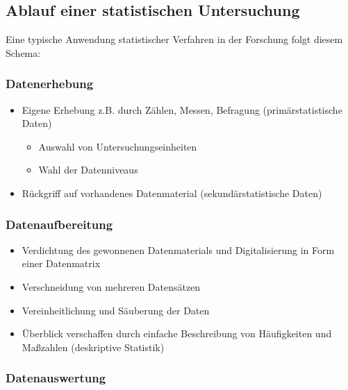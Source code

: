 \documentclass[
  11pt,
  ngerman,
  a4paper,
]{report}
\providecommand{\tightlist}{%
  \setlength{\itemsep}{0pt}\setlength{\parskip}{0pt}}
\begin{document}
\hypertarget{ablauf-einer-statistischen-untersuchung}{%
\subsection{Ablauf einer statistischen Untersuchung}\label{ablauf-einer-statistischen-untersuchung}}

Eine typische Anwendung statistischer Verfahren in der Forschung folgt diesem Schema:

\hypertarget{datenerhebung}{%
\subsubsection{Datenerhebung}\label{datenerhebung}}

\begin{itemize}
\tightlist
\item
  Eigene Erhebung z.B. durch Zählen, Messen, Befragung (primärstatistische Daten)

  \begin{itemize}
  \tightlist
  \item
    Auswahl von Untersuchungseinheiten
  \item
    Wahl der Datenniveaus
  \end{itemize}
\item
  Rückgriff auf vorhandenes Datenmaterial (sekundärstatistische Daten)
\end{itemize}

\hypertarget{datenaufbereitung}{%
\subsubsection{Datenaufbereitung}\label{datenaufbereitung}}

\begin{itemize}
\tightlist
\item
  Verdichtung des gewonnenen Datenmaterials und Digitalisierung in Form einer Datenmatrix
\item
  Verschneidung von mehreren Datensätzen
\item
  Vereinheitlichung und Säuberung der Daten
\item
  Überblick verschaffen durch einfache Beschreibung von Häufigkeiten und Maßzahlen (deskriptive Statistik)
\end{itemize}

\hypertarget{datenauswertung}{%
\subsubsection{Datenauswertung}\label{datenauswertung}}
\end{document}
